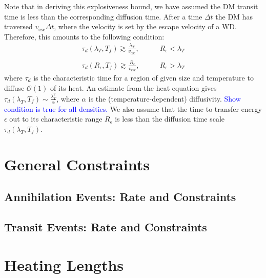 \documentclass[11 pt,preprint,preprintnumbers,amsmath,amssymb, prd]{revtex4}
\newcommand{\OO}{\mathcal{O}}
\begin{document}
Note that in deriving this explosiveness bound, we have assumed the DM transit time is less than the corresponding diffusion time. After a time $\Delta t$ the DM has traversed $v_{\text{esc}} \Delta t$, where the velocity is set by the escape velocity of a WD. Therefore, this amounts to the following condition:
\begin{equation}
\begin{array}{ll}
             \tau_d(\lambda_T, T_f) \gtrsim \frac{\lambda_T}{v_{\text{esc}}}, & \quad \quad R_\epsilon < \lambda_T \\ \\
            \tau_d(R_\epsilon, T_f)  \gtrsim \frac{R_\epsilon}{v_{\text{esc}}},  & \quad \quad R_\epsilon > \lambda_T
        \end{array}
\end{equation}
where $\tau_d$ is the characteristic time for a region of given size and temperature to diffuse $\OO(1)$ of its heat. An estimate from the heat equation gives $\tau_d(\lambda_T, T_f) \sim \frac{\lambda_T^2}{\alpha}$, where $\alpha$ is the (temperature-dependent) diffusivity. \textcolor{blue}{Show condition is true for all densities.} We also assume that the time to transfer energy $\epsilon$ out to its characteristic range $R_\epsilon$ is less than the diffusion time scale $\tau_d(\lambda_T, T_f)$.

\section{General Constraints}

\subsection{Annihilation Events: Rate and Constraints}

\subsection{Transit Events: Rate and Constraints}


\section{Heating Lengths}
\label{sec:heatinglengthsummary}
\end{document}
